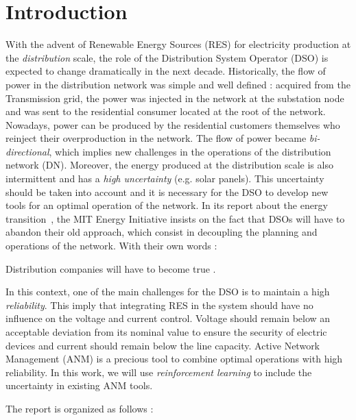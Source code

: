 \section{Introduction}
\label{sec:intro}
With the advent of Renewable Energy Sources (RES) for electricity production at the \emph{distribution} scale, the role of the Distribution System Operator (DSO) is expected to change dramatically in the next decade. 
Historically, the flow of power in the distribution network was simple and well defined : acquired from the Transmission grid, the power was injected in the network at the substation node and was sent to the residential consumer located at the root of the network. 
Nowadays, power can be produced by the residential customers themselves who reinject their overproduction in the network.
The flow of power became \emph{bi-directional}, which implies new challenges in the operations of the distribution network (DN). 
Moreover, the energy produced at the distribution scale is also intermittent and has a \emph{high uncertainty}
(e.g. solar panels). 
This uncertainty should be taken into account and it is necessary for the DSO to develop new tools for an optimal operation of the network.
In its report about the energy transition~\cite{utility}, the MIT Energy Initiative insists on the fact that DSOs will have to abandon their old  approach, which consist in decoupling the planning and operations of the network. 
With their own words : 
\begin{displayquote}
Distribution companies will have to become true .
\end{displayquote}

In this context, one of the main challenges for the DSO is to maintain a high \emph{reliability}. 
This imply that integrating RES in the system should have no influence on the voltage and current control. 
Voltage should remain below an acceptable deviation from its nominal value to ensure the security of electric devices and current should remain below the line capacity. 
Active Network Management (ANM) is a precious tool to combine optimal operations with high reliability. 
In this work, we will use \emph{reinforcement learning}
to include the uncertainty in existing ANM tools. 

The report is organized as follows :